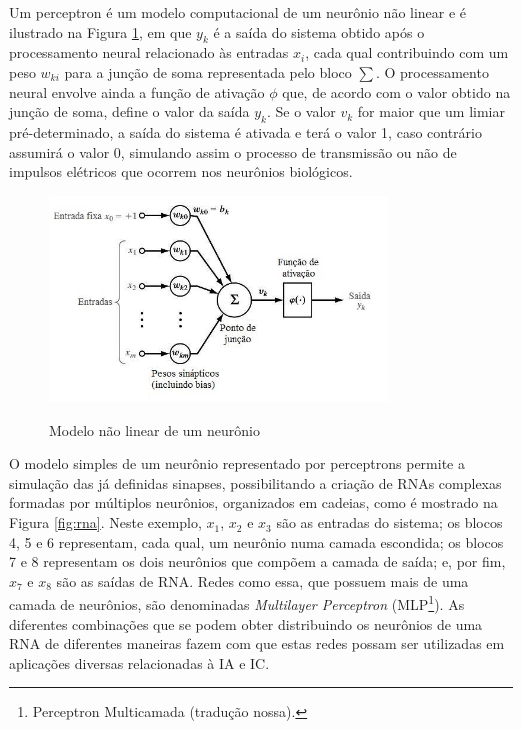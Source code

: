 Um perceptron é um modelo computacional de um neurônio não linear e é ilustrado na Figura \ref{fig:neuronmodel}, em que $y_k$ é a saída do sistema obtido após o processamento neural relacionado às entradas $x_i$, cada qual contribuindo com um peso $w_{ki}$ para a junção de soma representada pelo bloco $\sum$. O processamento neural envolve ainda a função de ativação $\phi$ que, de acordo com o valor obtido na junção de soma, define o valor da saída $y_k$. Se o valor $v_k$ for maior que um limiar pré-determinado, a saída do sistema é ativada e terá o valor 1, caso contrário assumirá o valor 0, simulando assim o processo de transmissão ou não de impulsos elétricos que ocorrem nos neurônios biológicos.

\begin{figure}[!htb]
    \centering
    \caption{Modelo não linear de um neurônio}
    \includegraphics[width=0.8\textwidth]{./04-figuras/neuron-diagram-gray_traduzido}
    \label{fig:neuronmodel}
\end{figure}

O modelo simples de um neurônio representado por perceptrons permite a simulação das já definidas sinapses, possibilitando a criação de RNAs complexas formadas por múltiplos neurônios, organizados em cadeias, como é mostrado na Figura \ref{fig:rna}. Neste exemplo, $x_1$, $x_2$ e $x_3$ são as entradas do sistema; os blocos 4, 5 e 6 representam, cada qual, um neurônio numa camada escondida; os blocos 7 e 8 representam os dois neurônios que compõem a camada de saída; e, por fim, $x_7$ e $x_8$ são as saídas de RNA. Redes como essa, que possuem mais de uma camada de neurônios, são denominadas \textit{Multilayer Perceptron} (MLP\footnote{Perceptron Multicamada (tradução nossa).}). As diferentes combinações que se podem obter distribuindo os neurônios de uma RNA de diferentes maneiras fazem com que estas redes possam ser utilizadas em aplicações diversas relacionadas à IA e IC.

